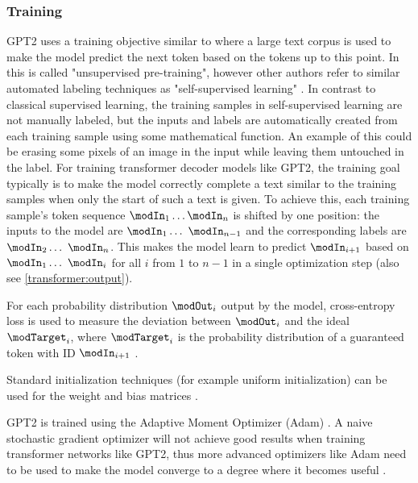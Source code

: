 
\subsubsection{Training}
\label{gpt2:training}

GPT2 uses a training objective similar to  where a large text corpus is used to make the model predict the next token based on the tokens up to this point.
In \cite{improvinglu} this is called "unsupervised pre-training", however other authors refer to similar automated labeling techniques as "self-supervised learning" \cite{selfsupervised} \cite{selfsupervisedvisual}.
In contrast to classical supervised learning, the training samples in self-supervised learning are not manually labeled, but the inputs and labels are automatically created from each training sample using some mathematical function. An example of this could be erasing some pixels of an image in the input while leaving them untouched in the label.
For training transformer decoder models like GPT2, the training goal typically is to make the model correctly complete a text similar to the training samples when only the start of such a text is given.
To achieve this, each training sample's token sequence $\modIn_1 \ldots \modIn_n$ is shifted by one position: the inputs to the model are $\modIn_1 \ldots \modIn_{n-1}$ and the corresponding labels are $\modIn_2 \ldots \modIn_n$. This makes the model learn to predict $\modIn_{i+1}$ based on $\modIn_1 \ldots \modIn_i$ for all $i$ from $1$ to $n-1$ in a single optimization step (also see \cref{transformer:output}).

For each probability distribution $\modOut_i$ output by the model, cross-entropy loss is used to measure the deviation between $\modOut_i$ and the ideal $\modTarget_i$,
where $\modTarget_i$ is the probability distribution of a guaranteed token with ID $\modIn_{i+1}$  \cite{HuggingFaceGPT2}.

Standard initialization techniques (for example uniform initialization) can be used for the weight and bias matrices .

GPT2 is trained using the Adaptive Moment Optimizer (Adam)  .
A naive stochastic gradient optimizer will not achieve good results when training transformer networks like GPT2, thus more advanced optimizers like Adam need to be used to make the model converge to a degree where it becomes useful \cite{adambeatssgd}.






